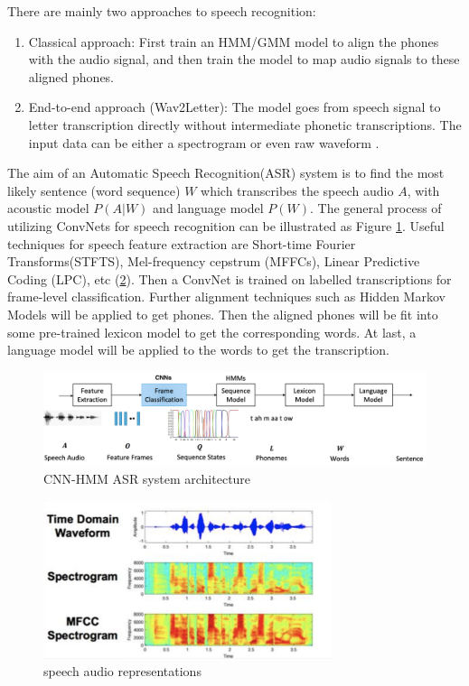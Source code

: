 There are mainly two approaches to speech recognition:
\begin{enumerate}
    \item Classical approach: First train an HMM/GMM model to align the phones with the audio signal, and then train the model to map audio signals to these aligned phones.
    \item End-to-end approach (Wav2Letter): The model goes from speech signal to letter transcription directly without intermediate phonetic transcriptions. The input data can be either a spectrogram or even raw waveform \cite{Collobert2017Wav2LetterAE}.
\end{enumerate}
The aim of an Automatic Speech Recognition(ASR) system is to find the most likely sentence (word sequence) $W$ which transcribes the speech audio $A$, with acoustic model $P(A|W)$ and language model $P(W)$. The general process of utilizing ConvNets for speech recognition can be illustrated as Figure \ref{fig:cnn_asr}.
Useful techniques for speech feature extraction are Short-time Fourier Transforms(STFTS), Mel-frequency cepstrum (MFFCs), Linear Predictive Coding (LPC), etc (\ref{fig:feature}). Then a ConvNet is trained on labelled transcriptions for frame-level classification. Further alignment techniques such as Hidden Markov Models will be applied to get phones. Then the aligned phones will be fit into some pre-trained lexicon model to get the corresponding words. At last, a language model will be applied to the words to get the transcription. 
\begin{figure}[ht]
    \centering
    \includegraphics[width=1\textwidth]{figs/cnn_asr.png}
    \caption{CNN-HMM ASR system architecture}
    \label{fig:cnn_asr}
\end{figure}
\begin{figure}[ht]
    \centering
    \includegraphics[width=0.75\textwidth]{figs/feature.png}
    \caption{speech audio representations}
    \label{fig:feature}
\end{figure}